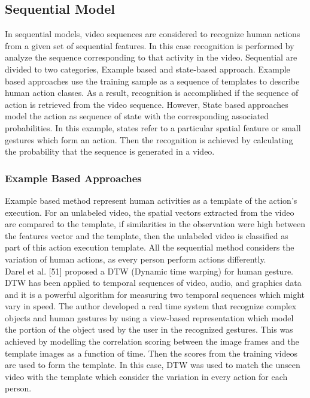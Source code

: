 \subsection{Sequential Model}
\hspace{5mm} In sequential models, video sequences are considered to recognize human actions from a given set of sequential features. In this case recognition is performed by analyze the sequence corresponding to that activity in the video. Sequential are divided to two categories, Example based and state-based approach. Example based approaches use the training sample as a sequence of templates to describe human action classes. As a result, recognition is accomplished if the sequence of action is retrieved from the video sequence. However, State based approaches model the action as sequence of state with the corresponding associated probabilities. In this example, states refer to a particular spatial feature or small gestures which form an action. Then the recognition is achieved by calculating the probability that the sequence is generated in a video.

\subsubsection{Example Based Approaches}
\hspace{5mm} Example based method represent human activities as a template of the action’s execution. For an unlabeled video, the spatial vectors extracted from the video are compared to the template, if similarities in the observation were high between the features vector and the template, then the unlabeled video is classified as part of this action execution template. All the sequential method considers the variation of human actions, as every person perform actions differently.\\ 

Darel et al. [51] proposed a DTW (Dynamic time warping) for human gesture. DTW has been applied to temporal sequences of video, audio, and graphics data and it is a powerful algorithm for measuring two temporal sequences which might vary in speed. The author developed a real time system that recognize complex objects and human gestures by using a view-based representation which model the portion of the object used by the user in the recognized gestures. This was achieved by modelling the correlation scoring between the image frames and the template images as a function of time. Then the scores from the training videos are used to form the template. In this case, DTW was used to match the unseen video with the template which consider the variation in every action for each person.\\

